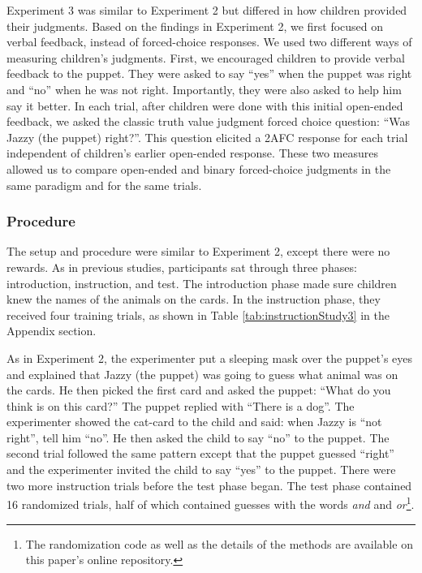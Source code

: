 \documentclass[,man,floatsintext]{apa6}
\let\rmarkdownfootnote\footnote%
\def\footnote{\protect\rmarkdownfootnote}
\begin{document}
Experiment 3 was similar to Experiment 2 but differed in how children provided their judgments. Based on the findings in Experiment 2, we first focused on verbal feedback, instead of forced-choice responses. We used two different ways of measuring children's judgments. First, we encouraged children to provide verbal feedback to the puppet. They were asked to say \enquote{yes} when the puppet was right and \enquote{no} when he was not right. Importantly, they were also asked to help him say it better. In each trial, after children were done with this initial open-ended feedback, we asked the classic truth value judgment forced choice question: \enquote{Was Jazzy (the puppet) right?}. This question elicited a 2AFC response for each trial independent of children's earlier open-ended response. These two measures allowed us to compare open-ended and binary forced-choice judgments in the same paradigm and for the same trials.

\hypertarget{procedure-2}{%
\subsubsection{Procedure}\label{procedure-2}}

The setup and procedure were similar to Experiment 2, except there were no rewards. As in previous studies, participants sat through three phases: introduction, instruction, and test. The introduction phase made sure children knew the names of the animals on the cards. In the instruction phase, they received four training trials, as shown in Table \ref{tab:instructionStudy3} in the Appendix section.

As in Experiment 2, the experimenter put a sleeping mask over the puppet's eyes and explained that Jazzy (the puppet) was going to guess what animal was on the cards. He then picked the first card and asked the puppet: \enquote{What do you think is on this card?} The puppet replied with \enquote{There is a dog}. The experimenter showed the cat-card to the child and said: when Jazzy is \enquote{not right}, tell him \enquote{no}. He then asked the child to say \enquote{no} to the puppet. The second trial followed the same pattern except that the puppet guessed \enquote{right} and the experimenter invited the child to say \enquote{yes} to the puppet. There were two more instruction trials before the test phase began. The test phase contained 16 randomized trials, half of which contained guesses with the words \emph{and} and \emph{or}\footnote{The randomization code as well as the details of the methods are available on this paper's online repository.}.
\end{document}
